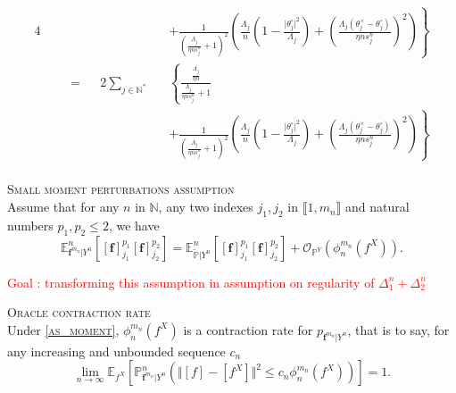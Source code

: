 \begin{alignat*}{4}
& && && && \left.+ \frac{1}{\left(\frac{\Lambda_{j}}{\eta n s_{j}^{n}} + 1\right)^{2}}\left(\frac{\Lambda_{j}}{n}\left(1 - \frac{\vert \theta^{\circ}_{j} \vert^{2}}{\Lambda_{j}}\right) + \left(\frac{\Lambda_{j}\left(\theta^{\times}_{j} - \theta^{\circ}_{j}\right)}{\eta n s_{j}^{n}}\right)^{2}\right)\right\}\\
& &&=&& 2 \sum\limits_{j \in \mathds{N^{*}}}&&\left\{ \frac{\frac{\Lambda_{j}}{\eta n}}{\frac{\Lambda_{j}}{\eta n s_{j}^{n}} + 1} \right.\\
& && && && \left.+ \frac{1}{\left(\frac{\Lambda_{j}}{\eta n s_{j}^{n}} + 1\right)^{2}}\left(\frac{\Lambda_{j}}{n}\left(1 - \frac{\vert \theta^{\circ}_{j} \vert^{2}}{\Lambda_{j}}\right) + \left(\frac{\Lambda_{j}\left(\theta^{\times}_{j} - \theta^{\circ}_{j}\right)}{\eta n s_{j}^{n}}\right)^{2}\right)\right\}\\
\end{alignat*}

\begin{as}{\textsc{Small moment perturbations assumption}\\}\label{as2.5.1}
Assume that for any $n$ in $\mathds{N}$, any two indexes $j_{1}, j_{2}$ in $\llbracket 1, m_{n} \rrbracket$ and natural numbers $p_{1}, p_{2} \leq 2$, we have
\[\mathds{E}_{\boldsymbol{f}^{m_{n}}\vert Y^{n}}^{n}\left[ [\boldsymbol{f}]_{j_{1}}^{p_{1}} [\boldsymbol{f}]_{j_{2}}^{p_{2}}\right] = \mathds{E}_{\widetilde{\mathds{P}}\vert Y^{n}}^{n}\left[[\boldsymbol{f}]_{j_{1}}^{p_{1}} [\boldsymbol{f}]_{j_{2}}^{p_{2}}\right] + \mathcal{O}_{\mathds{P}^{Y}}\left(\phi_{n}^{m_{n}}(f^{X})\right).\]
\end{as}

\textcolor{red}{Goal : transforming this assumption in assumption on regularity of $\Delta_{1}^{n} + \Delta_{2}^{n}$}

\begin{thm}{\textsc{Oracle contraction rate}\\}\label{thm2.5.1}
Under \textsc{\autoref{as_moment}}, $\phi_{n}^{m_{n}}(f^{X})$ is a contraction rate for $p_{\boldsymbol{f}^{m_{n}}\vert Y^{n}}$, that is to say, for any increasing and unbounded sequence $c_{n}$
\[\lim\limits_{n \rightarrow \infty} \mathds{E}_{f^{X}}\left[\mathds{P}_{\boldsymbol{f}^{m_{n}} \vert Y^{n}}^{n}\left(\Vert [f] - [f^{X}] \Vert^{2} \leq c_{n}\phi_{n}^{m_{n}}(f^{X}) \right)\right] = 1.\]
\end{thm}


